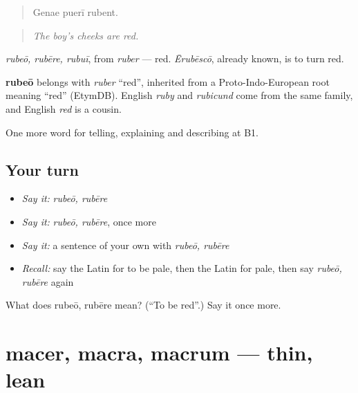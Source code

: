 \begin{quote}
Genae puerī rubent.
\end{quote}

\begin{quote}
\emph{The boy's cheeks are red.}
\end{quote}

\emph{rubeō, rubēre, rubuī}, from \emph{ruber} — red. \emph{Ērubēscō}, already known, is to turn red.

\begin{cousinweb}
\textbf{rubeō} belongs with \emph{ruber} \textquotedblleft{}red\textquotedblright{}, inherited from a Proto-Indo-European root meaning \textquotedblleft{}red\textquotedblright{} (EtymDB). English \emph{ruby} and \emph{rubicund} come from the same family, and English \emph{red} is a cousin.
\end{cousinweb}

\begin{grammarlens}[title={What you've built}]
One more word for telling, explaining and describing at B1.
\end{grammarlens}

\subsection*{Your turn}
\begin{itemize}
\raggedright
  \item \emph{Say it:} \emph{rubeō, rubēre}
  \item \emph{Say it:} \emph{rubeō, rubēre}, once more
  \item \emph{Say it:} a sentence of your own with \emph{rubeō, rubēre}
  \item \emph{Recall:} say the Latin for to be pale, then the Latin for pale, then say \emph{rubeō, rubēre} again
\end{itemize}

\begin{tcolorbox}[breakable,colback=teal!4,colframe=teal!35!black,title={Before you move on}]
What does rubeō, rubēre mean? (\textquotedblleft{}To be red\textquotedblright{}.) Say it once more.
\end{tcolorbox}
\section[macer, macra, macrum]{macer, macra, macrum — thin, lean}

\label{lesson:LA-C522-macer}



